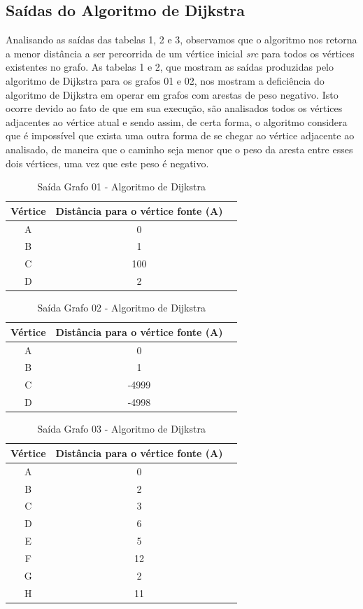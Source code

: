 \documentclass[12pt]{article}
\begin{document}
\subsection{Saídas do Algoritmo de Dijkstra}
Analisando as saídas  das tabelas 1, 2 e 3, observamos que o algoritmo nos retorna a menor distância a ser percorrida de um vértice inicial \textit{src} para todos os vértices existentes no grafo. As tabelas 1 e 2, que mostram as saídas produzidas pelo algoritmo de Dijkstra para os grafos 01 e 02, nos mostram a deficiência do algoritmo de Dijkstra em operar em grafos com  arestas de peso negativo. Isto ocorre devido ao fato de que em sua execução, são analisados todos os vértices adjacentes ao vértice atual e sendo assim, de certa forma, o algoritmo considera que é impossível que exista uma outra forma de se chegar ao vértice adjacente ao analisado, de maneira que o caminho seja menor que o peso da aresta entre esses dois vértices, uma vez que este peso é negativo.
\begin{table}[h!]
  \centering
  \caption{Saída Grafo 01 - Algoritmo de Dijkstra}
  \label{tab:table1}
  \begin{tabular}{ccc}
    \toprule
    Vértice & Distância para o vértice fonte (A)\\
    \midrule
    A & 0\\
    B & 1\\
    C & 100\\
   D & 2\\
    \bottomrule
  \end{tabular}
\end{table}

\begin{table}[h!]
  \centering
  \caption{Saída Grafo 02 - Algoritmo de Dijkstra}
  \label{tab:table1}
  \begin{tabular}{ccc}
    \toprule
    Vértice & Distância para o vértice fonte (A)\\
    \midrule
    A & 0\\
    B & 1\\
    C & -4999\\
   D & -4998\\
    \bottomrule
  \end{tabular}
\end{table}

\begin{table}[h!]
  \centering
  \caption{Saída Grafo 03 - Algoritmo de Dijkstra}
  \label{tab:table1}
  \begin{tabular}{ccc}
    \toprule
    Vértice & Distância para o vértice fonte (A)\\
    \midrule
    A & 0\\
    B & 2\\
    C & 3\\
    D & 6\\
    E & 5\\
     F & 12\\
      G & 2\\
       H & 11\\
    \bottomrule
  \end{tabular}
\end{table}
\end{document}
